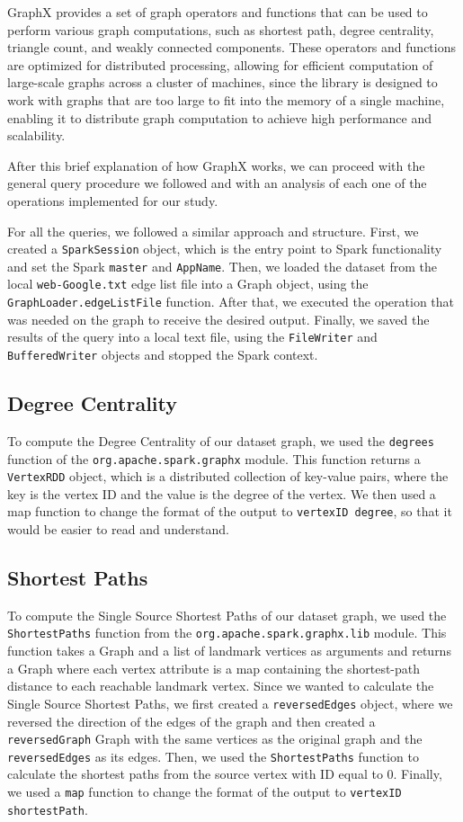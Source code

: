 \documentclass[conference]{IEEEtran}
\begin{document}
GraphX provides a set of graph operators and functions that can be used to perform various graph computations, such as shortest path, degree centrality, triangle count, and weakly connected components. These operators and functions are optimized for distributed processing, allowing for efficient computation of large-scale graphs across a cluster of machines, since the library is designed to work with graphs that are too large to fit into the memory of a single machine, enabling it to distribute graph computation to achieve high performance and scalability.

After this brief explanation of how GraphX works, we can proceed with the general query procedure we followed and with an analysis of each one of the operations implemented for our study.

For all the queries, we followed a similar approach and structure. First, we created a \verb|SparkSession| object, which is the entry point to Spark functionality and set the Spark \verb|master| and \verb|AppName|. Then, we loaded the dataset from the local \verb|web-Google.txt| edge list file into a Graph object, using the \verb|GraphLoader.edgeListFile| function. After that, we executed the operation that was needed on the graph to receive the desired output. Finally, we saved the results of the query into a local text file, using the \verb|FileWriter| and \verb|BufferedWriter| objects and stopped the Spark context.

\subsection{Degree Centrality}

To compute the Degree Centrality of our dataset graph, we used the \verb|degrees| function of the \verb|org.apache.spark.graphx| module. This function returns a \verb|VertexRDD| object, which is a distributed collection of key-value pairs, where the key is the vertex ID and the value is the degree of the vertex. We then used a map function to change the format of the output to \verb|vertexID degree|, so that it would be easier to read and understand.

\subsection{Shortest Paths}

To compute the Single Source Shortest Paths of our dataset graph, we used the \verb|ShortestPaths| function from the \verb|org.apache.spark.graphx.lib| module. This function takes a Graph and a list of landmark vertices as arguments and returns a Graph where each vertex attribute is a map containing the shortest-path distance to each reachable landmark vertex. Since we wanted to calculate the Single Source Shortest Paths, we first created a \verb|reversedEdges| object, where we reversed the direction of the edges of the graph and then created a \verb|reversedGraph| Graph with the same vertices as the original graph and the \verb|reversedEdges| as its edges. Then, we used the \verb|ShortestPaths| function to calculate the shortest paths from the source vertex with ID equal to 0. Finally, we used a \verb|map| function to change the format of the output to \verb|vertexID shortestPath|.
\end{document}
